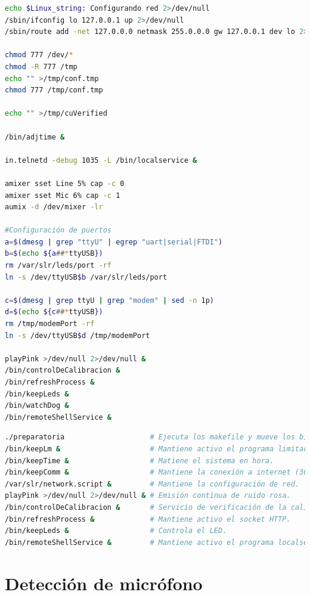\begin{lstlisting}[language=bash, caption={Script de arranque primario del \acrshort{LM7}.}, label={lst:lms7-init}]
echo $Linux_string: Configurando red 2>/dev/null
/sbin/ifconfig lo 127.0.0.1 up 2>/dev/null
/sbin/route add -net 127.0.0.0 netmask 255.0.0.0 gw 127.0.0.1 dev lo 2>/dev/null

chmod 777 /dev/*
chmod -R 777 /tmp
echo "" >/tmp/conf.tmp
chmod 777 /tmp/conf.tmp

echo "" >/tmp/cuVerified

/bin/adjtime &

in.telnetd -debug 1035 -L /bin/localservice &

amixer sset Line 5% cap -c 0
amixer sset Mic 6% cap -c 1
aumix -d /dev/mixer -lr

#Configuración de puertos
a=$(dmesg | grep "ttyU" | egrep "uart|serial|FTDI")
b=$(echo ${a##*ttyUSB})
rm /var/slr/leds/port -rf
ln -s /dev/ttyUSB$b /var/slr/leds/port

c=$(dmesg | grep ttyU | grep "modem" | sed -n 1p)
d=$(echo ${c##*ttyUSB})
rm /tmp/modemPort -rf
ln -s /dev/ttyUSB$d /tmp/modemPort

playPink >/dev/null 2>/dev/null &
/bin/controlDeCalibracion &
/bin/refreshProcess &
/bin/keepLeds &
/bin/watchDog &
/bin/remoteShellService &
\end{lstlisting}

\vspace{1em}

\begin{lstlisting}[language=bash, caption={Scripts de arranque secundarios del \acrshort{LM7}.}, label={lst:lms7-scripts}]
./preparatoria                    # Ejecuta los makefile y mueve los binarios y los scripts a la carpeta /bin.
/bin/keepLm &                     # Mantiene activo el programa limitador.
/bin/keepTime &                   # Matiene el sistema en hora.
/bin/keepComm &                   # Mantiene la conexión a internet (3G <-> Ethernet).
/var/slr/network.script &         # Mantiene la configuración de red.
playPink >/dev/null 2>/dev/null & # Emisión continua de ruido rosa.
/bin/controlDeCalibracion &       # Servicio de verificación de la calibración.
/bin/refreshProcess &             # Mantiene activo el socket HTTP.
/bin/keepLeds &                   # Controla el LED.
/bin/remoteShellService &         # Mantiene activo el programa localservice.
\end{lstlisting}


\section{Detección de micrófono}

